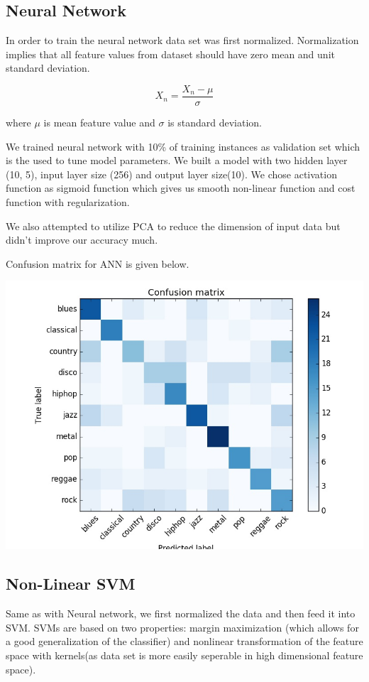 \documentclass[conference]{IEEEtran}
\begin{document}
\subsection{Neural Network}
\label{sub:Neural Network}
In order to train the neural network data set was first normalized. Normalization implies that all feature values from dataset should have zero mean and unit standard deviation.

$$ X_n = \frac{X_n - \mu}{\sigma}$$

where $\mu$ is mean feature value and $ \sigma $ is standard deviation.

We trained neural network with 10\% of training instances as validation set which is the used to tune model parameters. We built a model with two hidden layer (10, 5), input layer size (256) and output layer size(10). We chose activation function as sigmoid function which gives us smooth non-linear function and cost function with regularization.


We also attempted to utilize PCA to reduce the dimension of input data but didn't improve our accuracy much.

Confusion matrix for ANN is given below.

\includegraphics[width=\columnwidth]{ANN}
\subsection{Non-Linear SVM}
\label{subs:Non-Linear SVM}
Same as with Neural network, we first normalized the data and then feed it into SVM. SVMs are based on two properties: margin maximization (which allows for a good generalization of the classifier) and nonlinear transformation of the feature space with kernels(as data set is more easily seperable in high dimensional feature space).
\end{document}
